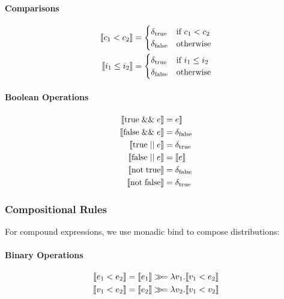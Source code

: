 \paragraph{Comparisons}
\begin{align*}
\llbracket  c_1 < c_2  \rrbracket &= \begin{cases}
    \delta_{\text{true}} & \text{if } c_1 < c_2 \\
    \delta_{\text{false}} & \text{otherwise}
\end{cases} \\
\llbracket  i_1 \leq i_2  \rrbracket &= \begin{cases}
    \delta_{\text{true}} & \text{if } i_1 \leq i_2 \\
    \delta_{\text{false}} & \text{otherwise}
\end{cases}
\end{align*}

\paragraph{Boolean Operations}
\begin{align*}
\llbracket  \text{true} \mathrel{\&\&} e  \rrbracket &=  e \rrbracket \\
\llbracket  \text{false} \mathrel{\&\&} e  \rrbracket &= \delta_{\text{false}} \\
\llbracket  \text{true} \mathrel{||} e  \rrbracket &= \delta_{\text{true}} \\
\llbracket  \text{false} \mathrel{||} e  \rrbracket &= \llbracket e \rrbracket \\
\llbracket  \text{not}\; \text{true}  \rrbracket &= \delta_{\text{false}} \\
\llbracket  \text{not}\; \text{false}  \rrbracket &= \delta_{\text{true}}
\end{align*}

\subsubsection{Compositional Rules}

For compound expressions, we use monadic bind to compose distributions:

\paragraph{Binary Operations}
\begin{align*}
\llbracket  e_1 < e_2  \rrbracket &= \llbracket e_1 \rrbracket \gg\!= \lambda v_1. \llbracket v_1 < e_2 \rrbracket \\
\llbracket  v_1 < e_2  \rrbracket &= \llbracket e_2 \rrbracket \gg\!= \lambda v_2. \llbracket v_1 < v_2 \rrbracket
\end{align*}

